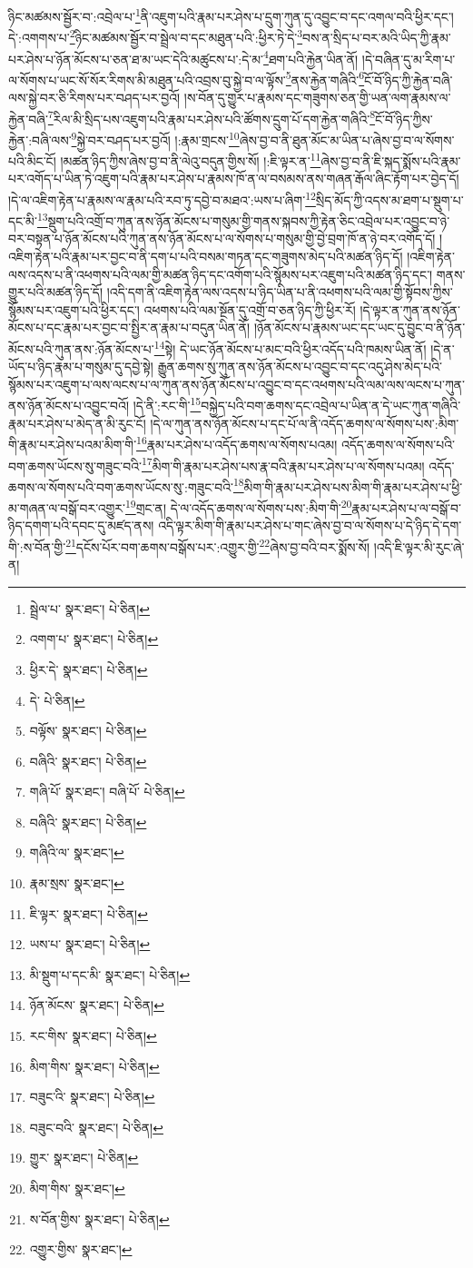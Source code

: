 ཉིང་མཚམས་སྦྱོར་བ་:འབྲེལ་པ་\footnote{སྦྲེལ་པ་  སྣར་ཐང་།  པེ་ཅིན། }ནི་འཇུག་པའི་རྣམ་པར་ཤེས་པ་དྲུག་ཀུན་དུ་འབྱུང་བ་དང་འགལ་བའི་ཕྱིར་དང་། དེ་:འགགས་པ་\footnote{འགག་པ་  སྣར་ཐང་།  པེ་ཅིན། }ཉིང་མཚམས་སྦྱོར་བ་སྦྲེལ་བ་དང་མཐུན་པའི་:ཕྱིར་ཏེ་དེ་\footnote{ཕྱིར་དེ་  སྣར་ཐང་།  པེ་ཅིན། }བས་ན་སྲིད་པ་བར་མའི་ཡིད་ཀྱི་རྣམ་པར་ཤེས་པ་ཉོན་མོངས་པ་ཅན་ཐ་མ་ཡང་དེའི་མཚུངས་པ་:དེ་མ་\footnote{དེ་  པེ་ཅིན། }ཐག་པའི་རྐྱེན་ཡིན་ནོ། །དེ་བཞིན་དུ་མ་རིག་པ་ལ་སོགས་པ་ཡང་སོ་སོར་རིགས་མི་མཐུན་པའི་འབྲས་བུ་སྐྱེ་བ་ལ་ལྟོས་\footnote{བལྟོས་  སྣར་ཐང་།  པེ་ཅིན། }ནས་རྐྱེན་གཞིའི་\footnote{བཞིའི་  སྣར་ཐང་།  པེ་ཅིན། }ངོ་བོ་ཉིད་ཀྱི་རྐྱེན་བཞི་ལས་སྐྱེ་བར་ཅི་རིགས་པར་བཤད་པར་བྱའོ། །ས་བོན་དུ་གྱུར་པ་རྣམས་དང་གཟུགས་ཅན་གྱི་ཡན་ལག་རྣམས་ལ་རྐྱེན་བཞི་\footnote{གཞི་པོ་  སྣར་ཐང་། བཞི་པོ་  པེ་ཅིན། }རིལ་མི་སྲིད་པས་འཇུག་པའི་རྣམ་པར་ཤེས་པའི་ཚོགས་དྲུག་པོ་དག་རྐྱེན་གཞིའི་\footnote{བཞིའི་  སྣར་ཐང་།  པེ་ཅིན། }ངོ་བོ་ཉིད་ཀྱིས་རྐྱེན་:བཞི་ལས་\footnote{གཞིའི་ལ་  སྣར་ཐང་། }སྐྱེ་བར་བཤད་པར་བྱའོ། །:རྣམ་གྲངས་\footnote{རྣམ་སྲས་  སྣར་ཐང་། }ཞེས་བྱ་བ་ནི་ཐུན་མོང་མ་ཡིན་པ་ཞེས་བྱ་བ་ལ་སོགས་པའི་མིང་ངོ། །མཚན་ཉིད་ཀྱིས་ཞེས་བྱ་བ་ནི་ལེའུ་བདུན་གྱིས་སོ། །:ཇི་ལྟར་ན་\footnote{ཇི་ལྟར་  སྣར་ཐང་།  པེ་ཅིན། }ཞེས་བྱ་བ་ནི་ཇི་སྐད་སྨོས་པའི་རྣམ་པར་འགོད་པ་ཡིན་ཏེ་འཇུག་པའི་རྣམ་པར་ཤེས་པ་རྣམས་ཁོ་ན་ལ་བསམས་ནས་གཞན་རྒོལ་ཞིང་རྟོག་པར་བྱེད་དོ། །དེ་ལ་འཇིག་རྟེན་པ་རྣམས་ལ་རྣམ་པའི་རབ་ཏུ་དབྱེ་བ་མཐའ་:ཡས་པ་ཞིག་\footnote{ཡས་པ་  སྣར་ཐང་།  པེ་ཅིན། }སྲིད་མོད་ཀྱི་འདས་མ་ཐག་པ་སྡུག་པ་དང་མི་\footnote{མི་སྡུག་པ་དང་མི་  སྣར་ཐང་།  པེ་ཅིན། }སྡུག་པའི་འགྲོ་བ་ཀུན་ནས་ཉོན་མོངས་པ་གསུམ་གྱི་གནས་སྐབས་ཀྱི་རྟེན་ཅིང་འབྲེལ་པར་འབྱུང་བ་ཉེ་བར་བསྟན་པ་ཉོན་མོངས་པའི་ཀུན་ནས་ཉོན་མོངས་པ་ལ་སོགས་པ་གསུམ་གྱི་བྱེ་བྲག་ཁོ་ན་ཉེ་བར་འགོད་དོ། །འཇིག་རྟེན་པའི་རྣམ་པར་བྱང་བ་ནི་དག་པ་པའི་བསམ་གཏན་དང་གཟུགས་མེད་པའི་མཚན་ཉིད་དོ། །འཇིག་རྟེན་ལས་འདས་པ་ནི་འཕགས་པའི་ལམ་གྱི་མཚན་ཉིད་དང་འགོག་པའི་སྙོམས་པར་འཇུག་པའི་མཚན་ཉིད་དང་། གནས་གྱུར་པའི་མཚན་ཉིད་དོ། །འདི་དག་ནི་འཇིག་རྟེན་ལས་འདས་པ་ཉིད་ཡིན་པ་ནི་འཕགས་པའི་ལམ་གྱི་སྟོབས་ཀྱིས་སྙོམས་པར་འཇུག་པའི་ཕྱིར་དང་། འཕགས་པའི་ལམ་སྔོན་དུ་འགྲོ་བ་ཅན་ཉིད་ཀྱི་ཕྱིར་རོ། །དེ་ལྟར་ན་ཀུན་ནས་ཉོན་མོངས་པ་དང་རྣམ་པར་བྱང་བ་སྤྱིར་ན་རྣམ་པ་བདུན་ཡིན་ནོ། །ཉོན་མོངས་པ་རྣམས་ཡང་དང་ཡང་དུ་བྱུང་བ་ནི་ཉོན་མོངས་པའི་ཀུན་ནས་:ཉོན་མོངས་པ་\footnote{ཉོན་མོངས་  སྣར་ཐང་།  པེ་ཅིན། }སྟེ། དེ་ཡང་ཉོན་མོངས་པ་མང་བའི་ཕྱིར་འདོད་པའི་ཁམས་ཡིན་ནོ། །དེ་ན་ཡོད་པ་ཉིད་རྣམ་པ་གསུམ་དུ་དབྱེ་སྟེ། རྒྱུན་ཆགས་སུ་ཀུན་ནས་ཉོན་མོངས་པ་འབྱུང་བ་དང་འདུ་ཤེས་མེད་པའི་སྙོམས་པར་འཇུག་པ་ལས་ལངས་པ་ལ་ཀུན་ནས་ཉོན་མོངས་པ་འབྱུང་བ་དང་འཕགས་པའི་ལམ་ལས་ལངས་པ་ཀུན་ནས་ཉོན་མོངས་པ་འབྱུང་བའོ། །དེ་ནི་:རང་གི་\footnote{རང་གིས་  སྣར་ཐང་།  པེ་ཅིན། }བསྐྱེད་པའི་བག་ཆགས་དང་འབྲེལ་པ་ཡིན་ན་དེ་ཡང་ཀུན་གཞིའི་རྣམ་པར་ཤེས་པ་མེད་ན་མི་རུང་ངོ། །དེ་ལ་ཀུན་ནས་ཉོན་མོངས་པ་དང་པོ་ལ་ནི་འདོད་ཆགས་ལ་སོགས་པས་:མིག་གི་རྣམ་པར་ཤེས་པའམ་མིག་གི་\footnote{མིག་གིས་  སྣར་ཐང་།  པེ་ཅིན། }རྣམ་པར་ཤེས་པ་འདོད་ཆགས་ལ་སོགས་པའམ། འདོད་ཆགས་ལ་སོགས་པའི་བག་ཆགས་ཡོངས་སུ་གཟུང་བའི་\footnote{བཟུང་འི་  སྣར་ཐང་།  པེ་ཅིན། }མིག་གི་རྣམ་པར་ཤེས་པས་རྣ་བའི་རྣམ་པར་ཤེས་པ་ལ་སོགས་པའམ། འདོད་ཆགས་ལ་སོགས་པའི་བག་ཆགས་ཡོངས་སུ་:གཟུང་བའི་\footnote{བཟུང་བའི་  སྣར་ཐང་།  པེ་ཅིན། }མིག་གི་རྣམ་པར་ཤེས་པས་མིག་གི་རྣམ་པར་ཤེས་པ་ཕྱི་མ་གཞན་ལ་བསྒོ་བར་འགྱུར་\footnote{གྱུར་  སྣར་ཐང་།  པེ་ཅིན། }གྲང་ན། དེ་ལ་འདོད་ཆགས་ལ་སོགས་པས་:མིག་གི་\footnote{མིག་གིས་  སྣར་ཐང་། }རྣམ་པར་ཤེས་པ་ལ་བསྒོ་བ་ཉིད་དགག་པའི་དབང་དུ་མཛད་ནས། འདི་ལྟར་མིག་གི་རྣམ་པར་ཤེས་པ་གང་ཞེས་བྱ་བ་ལ་སོགས་པ་དེ་ཉིད་དེ་དག་གི་:ས་བོན་གྱི་\footnote{ས་བོན་གྱིས་  སྣར་ཐང་།  པེ་ཅིན། }དངོས་པོར་བག་ཆགས་བསྒོས་པར་:འགྱུར་གྱི་\footnote{འགྱུར་གྱིས་  སྣར་ཐང་། }ཞེས་བྱ་བའི་བར་སྨོས་སོ། །འདི་ཇི་ལྟར་མི་རུང་ཞེ་ན། 